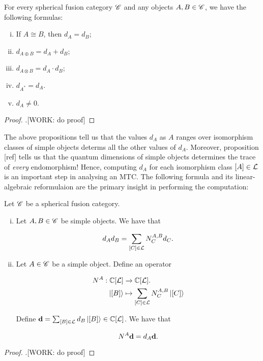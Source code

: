\begin{proposition} For every spherical fusion category $\mathscr{C}$ and any objects $A,B\in \mathscr{C}$, we have the following formulas:

\begin{enumerate}[(i)]
\item If $A\cong B$, then $d_A=d_B$;
\item $d_{A\oplus B}=d_{A}+d_B$;
\item $d_{A\otimes B}=d_{A}\cdot d_{B}$;
\item $d_{A^*}=d_A$.
\item $d_A\neq 0$.
\end{enumerate}
\end{proposition}
\begin{proof}.[WORK: do proof]
\end{proof}

The above propositions tell us that the values $d_A$ as $A$ ranges over isomorphism classes of simple objects determs all the other values of $d_A$. Moreover, proposition [ref] tells us that the quantum dimensions of simple objects determines the trace of \textit{every} endomorphism! Hence, computing $d_{A}$ for each isomorphism class $[A]\in \mathcal{L}$ is an important step in analysing an MTC. The following formula and its linear-algebraic reformulaion are the primary insight in performing the computation:

\begin{proposition} Let $\mathscr{C}$ be a spherical fusion category.

\begin{enumerate}[(i)]
\item Let $A,B\in \mathscr{C}$ be simple objects. We have that

$$d_Ad_B=\sum_{[C]\in \mathcal{L}}N^{A,B}_C d_C.$$

\item Let $A\in \mathscr{C}$ be a simple object. Define an operator

 \begin{align*}
N^{A}:\mathbb{C}[\mathcal{L}]&\xrightarrow{} \mathbb{C}[\mathcal{L}].\\
\ket{[B]}&\mapsto \sum_{[C]\in \mathcal{L}} N^{A,B}_C \ket{[C]}
\end{align*}

Define $\bold{d} = \sum_{[B]\in \mathcal{L}} d_{B}\ket{[B]}\in \mathbb{C}[\mathcal{L}]$. We have that

$$N^{A}\bold{d}=d_{A}\bold{d}.$$

\end{enumerate}

\end{proposition}
\begin{proof}.[WORK: do proof]
\end{proof}

